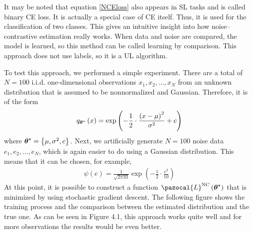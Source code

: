 It may be noted that equation \eqref{NCEloss} also appears in SL tasks and is called binary
CE loss. It is actually a special case of CE itself. Thus, it is used for the classification of two classes. This gives an intuitive insight into how noise--contrastive estimation
really works. When data and noise are compared, the model is learned, so this method can be called
learning by comparison. This approach does not use labels, so it is a UL algorithm. 
\begin{example}
To test this approach, we performed a simple experiment. There are a total of $N = 100$ i.i.d. one-dimensional observations $x_1,x_2,\dots,x_N$ from an unknown distribution that is assumed to be nonnormalized and Gaussian. Therefore, it is of the form
\begin{align}
    q_{\boldsymbol{\theta}^\star}\left(x\right) = \exp\left(-\frac{1}{2}\cdot\frac{\left(x-\mu\right)^2}{\sigma^2} + c \right)
\end{align}
where $\boldsymbol{\theta}^\star = \left\lbrace \mu, \sigma^2, c \right\rbrace$. Next, we artificially generate $N = 100$ noise data $e_1,e_2,\dots,e_N$, which is again easier to do using a Gaussian distribution. This means that it can be chosen, for example,
\begin{align}
    \psi\left(e\right) = \frac{1}{\sqrt{2\pi 10}}\exp\left(-\frac{1}{2}\cdot\frac{e^2}{10} \right)
\end{align}
At this point, it is possible to construct a function $\pazocal{L}^{\mathrm{NC}}\left(\bt^\star\right)$ that is minimized by using stochastic
gradient descent. The following figure shows the training process and the comparison between
the estimated distribution and the true one. As can be seen in Figure 4.1, this approach works quite well and for more observations the results would be even better.
\begin{figure}[h]
	\centering

\end{figure}
\end{example}
